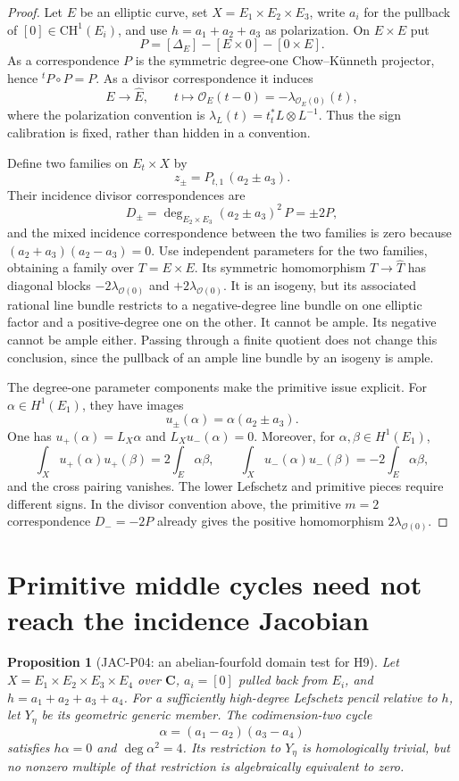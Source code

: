 \documentclass[11pt,a4paper]{article}
\newtheorem{proposition}[theorem]{Proposition}
\begin{document}
\begin{proof}
Let $E$ be an elliptic curve, set $X=E_1\times E_2\times E_3$,
write $a_i$ for the pullback of $[0]\in\mathrm{CH}^1(E_i)$, and use
$h=a_1+a_2+a_3$ as polarization.  On $E\times E$ put
\[
 P=[\Delta_E]-[E\times0]-[0\times E].
\]
As a correspondence $P$ is the symmetric degree-one Chow--K\"unneth
projector, hence ${}^tP\circ P=P$.
As a divisor correspondence it induces
\[
 E\longrightarrow\widehat E,
 \qquad t\longmapsto\mathcal O_E(t-0)=-\lambda_{\mathcal O_E(0)}(t),
\]
where the polarization convention is
$\lambda_L(t)=t_t^*L\otimes L^{-1}$.
Thus the sign calibration is fixed, rather than hidden in a convention.

Define two families on $E_t\times X$ by
\[
 z_\pm=P_{t,1}\,(a_2\pm a_3).
\]
Their incidence divisor correspondences are
\[
 D_\pm=\deg_{E_2\times E_3}(a_2\pm a_3)^2\,P
       =\pm2P,
\]
and the mixed incidence correspondence between the two families
is zero because $(a_2+a_3)(a_2-a_3)=0$.
Use independent parameters for the two families, obtaining a family
over $T=E\times E$.  Its symmetric homomorphism $T\to\widehat T$
has diagonal blocks $-2\lambda_{\mathcal O(0)}$ and
$+2\lambda_{\mathcal O(0)}$.  It is an isogeny, but its associated
rational line bundle restricts to a negative-degree line bundle on one
elliptic factor and a positive-degree one on the other.  It cannot be
ample.  Its negative cannot be ample either.  Passing through a finite
quotient does not change this conclusion, since the pullback of an
ample line bundle by an isogeny is ample.

The degree-one parameter components make the primitive issue explicit.
For $\alpha\in H^1(E_1)$, they have images
\[
 u_\pm(\alpha)=\alpha(a_2\pm a_3).
\]
One has $u_+(\alpha)=L_X\alpha$ and $L_Xu_-(\alpha)=0$.
Moreover, for $\alpha,\beta\in H^1(E_1)$,
\[
 \int_Xu_+(\alpha)u_+(\beta)=2\int_E\alpha\beta,
 \qquad
 \int_Xu_-(\alpha)u_-(\beta)=-2\int_E\alpha\beta,
\]
and the cross pairing vanishes.  The lower Lefschetz and primitive
pieces require different signs.  In the divisor convention above,
the primitive $m=2$ correspondence $D_-=-2P$ already gives the
positive homomorphism $2\lambda_{\mathcal O(0)}$.
\end{proof}

\section{Primitive middle cycles need not reach the incidence Jacobian}

\begin{proposition}[JAC-P04: an abelian-fourfold domain test for H9]
\label{jac:P04}
Let $X=E_1\times E_2\times E_3\times E_4$ over $\mathbf C$,
$a_i=[0]$ pulled back from $E_i$, and $h=a_1+a_2+a_3+a_4$.
For a sufficiently high-degree Lefschetz pencil relative to $h$, let
$Y_\eta$ be its geometric generic member.  The codimension-two cycle
\[
 \alpha=(a_1-a_2)(a_3-a_4)
\]
satisfies $h\alpha=0$ and $\deg\alpha^2=4$.  Its restriction to
$Y_\eta$ is homologically trivial, but no nonzero multiple of that
restriction is algebraically equivalent to zero.
\end{proposition}
\end{document}
